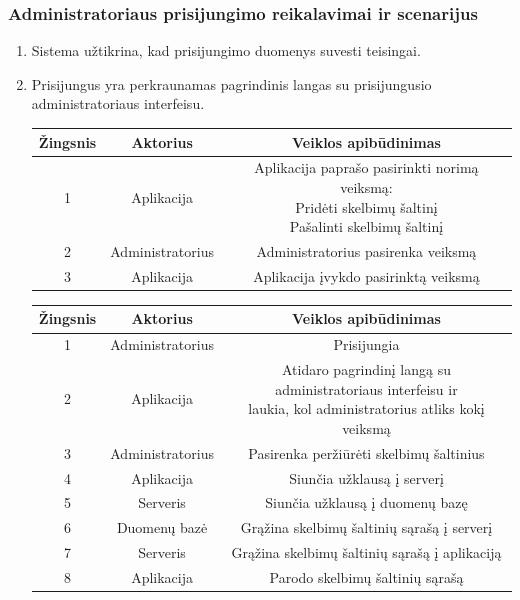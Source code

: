 \documentclass[12pt]{article}
\begin{document}
	\subsubsection{Administratoriaus prisijungimo reikalavimai ir scenarijus}
	\begin{enumerate}
		\item Sistema užtikrina, kad prisijungimo duomenys suvesti teisingai.
		\item Prisijungus yra perkraunamas pagrindinis langas su prisijungusio administratoriaus interfeisu. 
		
		\begin{center}
		\begin{tabular}{ | c | c | c | }
			\hline
			Žingsnis & Aktorius         & Veiklos apibūdinimas \\ \hline
			1        & Aplikacija       & \makecell{Aplikacija paprašo pasirinkti norimą veiksmą: \\ Pridėti skelbimų šaltinį \\ Pašalinti skelbimų šaltinį} \\ \hline
			2        & Administratorius & Administratorius pasirenka veiksmą \\ \hline
			3        & Aplikacija       & Aplikacija įvykdo pasirinktą veiksmą \\ \hline
		\end{tabular}
		\end{center}	
		
		\begin{center}
		\begin{tabular}{ | c | c | c | }
			\hline
			Žingsnis & Aktorius         & Veiklos apibūdinimas \\ \hline
			1        & Administratorius & Prisijungia \\ \hline
			2        & Aplikacija       & \makecell{Atidaro pagrindinį langą su administratoriaus interfeisu ir \\ laukia, kol administratorius atliks kokį veiksmą} \\ \hline
			3        & Administratorius & Pasirenka peržiūrėti skelbimų šaltinius \\ \hline
			4        & Aplikacija       & Siunčia užklausą į serverį \\ \hline
			5        & Serveris         & Siunčia užklausą į duomenų bazę \\ \hline
			6        & Duomenų bazė     & Grąžina skelbimų šaltinių sąrašą į serverį \\ \hline
			7        & Serveris         & Grąžina skelbimų šaltinių sąrašą į aplikaciją \\ \hline
			8        & Aplikacija       & Parodo skelbimų šaltinių sąrašą \\ \hline
		\end{tabular}
		\end{center}	
		

\end{enumerate}
\end{document}
